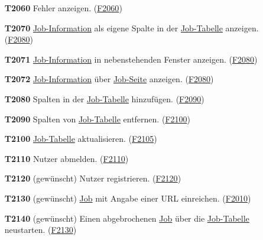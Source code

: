\begin{itemize}
    \item[\textbf{T2060}] Fehler anzeigen. (\hyperref[FA:Web-Interface:Anzeigen von Fehlern]{F2060})
    
    \item[\textbf{T2070}] \hyperref[B:Job-Informationen]{Job-Information} als eigene Spalte in der \hyperref[pages:job-table]{Job-Tabelle} anzeigen. (\hyperref[FA:Web-Interface:Einsehen von Job-Informationen]{F2080})
    
    \item[\textbf{T2071}] \hyperref[B:Job-Informationen]{Job-Information} in nebenstehenden Fenster anzeigen. (\hyperref[FA:Web-Interface:Einsehen von Job-Informationen]{F2080})
    
    \item[\textbf{T2072}] \hyperref[B:Job-Informationen]{Job-Information} über \hyperref[pages:job-page]{Job-Seite} anzeigen. (\hyperref[FA:Web-Interface:Einsehen von Job-Informationen]{F2080})
    
    \item[\textbf{T2080}] Spalten in der \hyperref[pages:job-table]{Job-Tabelle} hinzufügen. (\hyperref[FA:Web-Interface:Hinzufügen von Spalten]{F2090})
    
    \item[\textbf{T2090}] Spalten von \hyperref[pages:job-table]{Job-Tabelle} entfernen. (\hyperref[FA:Web-Interface:Entfernen von Spalten]{F2100}) 
    
    \item[\textbf{T2100}] \hyperref[pages:job-table]{Job-Tabelle} aktualisieren. (\hyperref[FA:Web-Interface:Aktualisieren]{F2105})
    
    \item[\textbf{T2110}] \gls{Nutzer} abmelden. (\hyperref[FA:Web-Interface:Abmelden]{F2110})
    
    \item[\textbf{T2120}] (gewünscht) \gls{Nutzer} registrieren. (\hyperref[FA:Web-Interface:Registrierung von Nutzern]{F2120})
    
    \item[\textbf{T2130}] (gewünscht) \hyperref[B:Jobs]{Job} mit Angabe einer \gls{URL} einreichen. (\hyperref[FA:Web-Interface:Job einreichen]{F2010})
    
    \item[\textbf{T2140}] (gewünscht) Einen abgebrochenen \hyperref[B:Jobs]{Job} über die \hyperref[pages:job-table]{Job-Tabelle} neustarten. (\hyperref[FA:Web-Interface:Neustart]{F2130})
    

\end{itemize}
